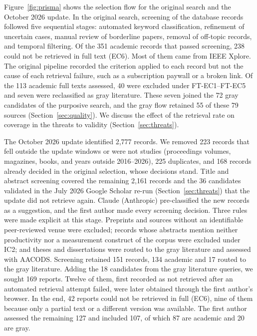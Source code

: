 \documentclass[preprint,number]{elsarticle}
\begin{document}
Figure~\ref{fig:prisma} shows the selection flow for the original search and the October 2026 update. In the original search, screening of the database records followed five sequential stages: automated keyword classification, refinement of uncertain cases, manual review of borderline papers, removal of off-topic records, and temporal filtering. Of the 351 academic records that passed screening, 238 could not be retrieved in full text (EC6). Most of them came from IEEE Xplore. The original pipeline recorded the criterion applied to each record but not the cause of each retrieval failure, such as a subscription paywall or a broken link. Of the 113 academic full texts assessed, 40 were excluded under FT-EC1--FT-EC5 and seven were reclassified as gray literature. These seven joined the 72 gray candidates of the purposive search, and the gray flow retained 55 of these 79 sources (Section~\ref{sec:quality}). We discuss the effect of the retrieval rate on coverage in the threats to validity (Section~\ref{sec:threats}).

The October 2026 update identified 2{,}777 records. We removed 223 records that fell outside the update windows or were not studies (proceedings volumes, magazines, books, and years outside 2016--2026), 225 duplicates, and 168 records already decided in the original selection, whose decisions stand. Title and abstract screening covered the remaining 2{,}161 records and the 36 candidates validated in the July 2026 Google Scholar re-run (Section~\ref{sec:threats}) that the update did not retrieve again. Claude (Anthropic) pre-classified the new records as a suggestion, and the first author made every screening decision. Three rules were made explicit at this stage. Preprints and sources without an identifiable peer-reviewed venue were excluded; records whose abstracts mention neither productivity nor a measurement construct of the corpus were excluded under IC2; and theses and dissertations were routed to the gray literature and assessed with AACODS. Screening retained 151 records, 134 academic and 17 routed to the gray literature. Adding the 18 candidates from the gray literature queries, we sought 169 reports. Twelve of them, first recorded as not retrieved after an automated retrieval attempt failed, were later obtained through the first author's browser. In the end, 42 reports could not be retrieved in full (EC6), nine of them because only a partial text or a different version was available. The first author assessed the remaining 127 and included 107, of which 87 are academic and 20 are gray.
\end{document}
